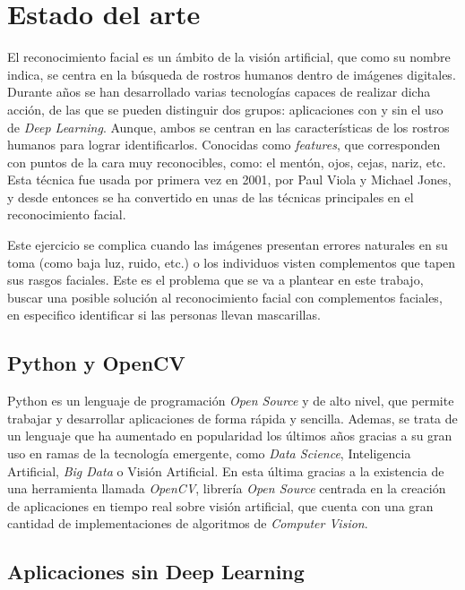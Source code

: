 
\chapter{Estado del arte}

El reconocimiento facial es un ámbito de la visión artificial, que como su nombre indica, se centra en la búsqueda de rostros humanos dentro de imágenes digitales. Durante años se han desarrollado varias tecnologías capaces de realizar dicha acción, de las que se pueden distinguir dos grupos: aplicaciones con y sin el uso de \textit{Deep Learning}. Aunque, ambos se centran en las características de los rostros humanos para lograr identificarlos. Conocidas como \textit{features}, que corresponden con puntos de la cara muy reconocibles, como: el mentón, ojos, cejas, nariz, etc. Esta técnica fue usada por primera vez en 2001, por Paul Viola y Michael Jones, y desde entonces se ha convertido en unas de las técnicas principales en el reconocimiento facial.

Este ejercicio se complica cuando las imágenes presentan errores naturales en su toma (como baja luz, ruido, etc.) o los individuos visten complementos que tapen sus rasgos faciales. Este es el problema que se va a plantear en este trabajo, buscar una posible solución al reconocimiento facial con complementos faciales, en especifico identificar si las personas llevan mascarillas.

\section{Python y OpenCV}

Python es un lenguaje de programación \textit{Open Source} y de alto nivel, que permite trabajar y desarrollar aplicaciones de forma rápida y sencilla. Ademas, se trata de un lenguaje que ha aumentado en popularidad los últimos años gracias a su gran uso en ramas de la tecnología emergente, como \textit{Data Science}, Inteligencia Artificial, \textit{Big Data} o Visión Artificial. En esta última gracias a la existencia de una herramienta llamada \textit{OpenCV}, librería \textit{Open Source} centrada en la creación de aplicaciones en tiempo real sobre visión artificial, que cuenta con una gran cantidad de implementaciones de algoritmos de \textit{Computer Vision}.

\section{Aplicaciones sin Deep Learning}

